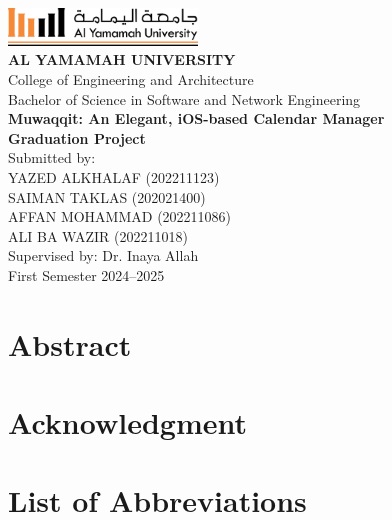 \documentclass[12pt,a4paper]{report}
\begin{document}
\begin{titlepage}
    \begin{center}
        \vspace*{1cm}
        \includegraphics[height=1cm]{images/yu-logo.png}\\[1cm]
        {\Large\bfseries AL YAMAMAH UNIVERSITY}\\[0.5cm]
        {\large College of Engineering and Architecture}\\[0.5cm]
        {\large Bachelor of Science in Software and Network Engineering}\\[2cm]
        {\Huge\bfseries Muwaqqit: An Elegant, iOS-based Calendar Manager}\\[2cm]
        {\Large\bfseries Graduation Project}\\[2cm]
        {\large Submitted by:}\\[0.3cm]
        {\large 
        YAZED ALKHALAF (202211123)\\
        SAIMAN TAKLAS (202021400)\\
        AFFAN MOHAMMAD (202211086)\\
        ALI BA WAZIR (202211018)
        }\\[1cm]
        {\large Supervised by: Dr. Inaya Allah}\\[1cm]
        {\large First Semester 2024--2025}
    \end{center}
\end{titlepage}

\chapter*{Abstract}

\chapter*{Acknowledgment}
\newpage

\tableofcontents
\listoffigures
\listoftables
\newpage

\chapter*{List of Abbreviations}
\end{document}
